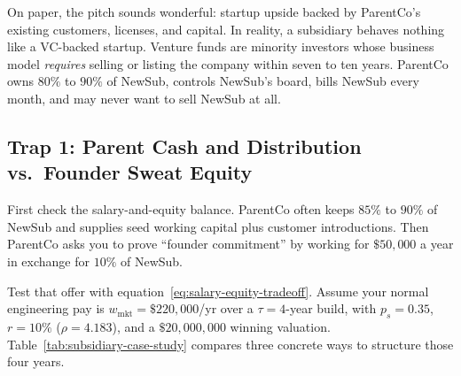 On paper, the pitch sounds wonderful: startup upside backed by ParentCo's existing customers, licenses, and capital. In reality, a subsidiary behaves nothing like a VC-backed startup. Venture funds are minority investors whose business model \emph{requires} selling or listing the company within seven to ten years. ParentCo owns $80\%$ to $90\%$ of NewSub, controls NewSub's board, bills NewSub every month, and may never want to sell NewSub at all.



\subsection{Trap 1: Parent Cash and Distribution vs.\ Founder Sweat Equity}
\label{subsec:entity-and-instrument}
\label{subsec:case-study-subsidiary-founder}

First check the salary-and-equity balance. ParentCo often keeps $85\%$ to $90\%$ of NewSub and supplies seed working capital plus customer introductions. Then ParentCo asks you to prove ``founder commitment'' by working for $\$50{,}000$ a year in exchange for $10\%$ of NewSub.

Test that offer with equation~\eqref{eq:salary-equity-tradeoff}. Assume your normal engineering pay is $w_{\text{mkt}} = \$220{,}000$/yr over a $\tau = 4$-year build, with $p_s = 0.35$, $r = 10\%$ ($\rho = 4.183$), and a $\$20{,}000{,}000$ winning valuation. Table~\ref{tab:subsidiary-case-study} compares three concrete ways to structure those four years.

